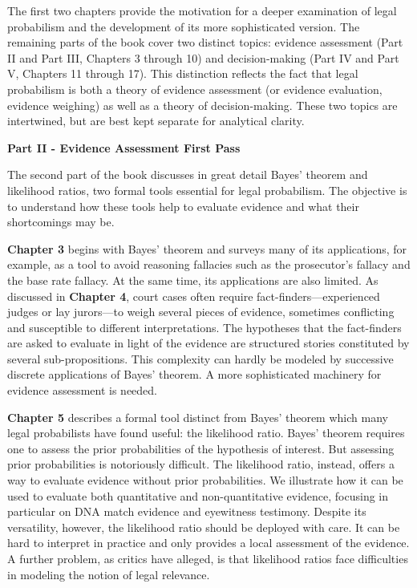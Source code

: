 \documentclass[
  10pt,
  dvipsnames,enabledeprecatedfontcommands]{scrartcl}
\begin{document}
The first two chapters provide the motivation for a deeper examination
of legal probabilism and the development of its more sophisticated
version. The remaining parts of the book cover two distinct topics:
evidence assessment (Part II and Part III, Chapters 3 through 10) and
decision-making (Part IV and Part V, Chapters 11 through 17). This
distinction reflects the fact that legal probabilism is both a theory of
evidence assessment (or evidence evaluation, evidence weighing) as well
as a theory of decision-making. These two topics are intertwined, but
are best kept separate for analytical clarity.

\vspace{3mm}

\noindent \textbf{Part II - Evidence Assessment First Pass}

\noindent The second part of the book discusses in great detail Bayes'
theorem and likelihood ratios, two formal tools essential for legal
probabilism. The objective is to understand how these tools help to
evaluate evidence and what their shortcomings may be.

\textbf{Chapter 3} begins with Bayes' theorem and surveys many of its
applications, for example, as a tool to avoid reasoning fallacies such
as the prosecutor's fallacy and the base rate fallacy. At the same time,
its applications are also limited. As discussed in \textbf{Chapter 4},
court cases often require fact-finders---experienced judges or lay
jurors---to weigh several pieces of evidence, sometimes conflicting and
susceptible to different interpretations. The hypotheses that the
fact-finders are asked to evaluate in light of the evidence are
structured stories constituted by several sub-propositions. This
complexity can hardly be modeled by successive discrete applications of
Bayes' theorem. A more sophisticated machinery for evidence assessment
is needed.

\textbf{Chapter 5} describes a formal tool distinct from Bayes' theorem
which many legal probabilists have found useful: the likelihood ratio.
Bayes' theorem requires one to assess the prior probabilities of the
hypothesis of interest. But assessing prior probabilities is notoriously
difficult. The likelihood ratio, instead, offers a way to evaluate
evidence without prior probabilities. We illustrate how it can be used
to evaluate both quantitative and non-quantitative evidence, focusing in
particular on DNA match evidence and eyewitness testimony. Despite its
versatility, however, the likelihood ratio should be deployed with care.
It can be hard to interpret in practice and only provides a local
assessment of the evidence. A further problem, as critics have alleged,
is that likelihood ratios face difficulties in modeling the notion of
legal relevance.
\end{document}

